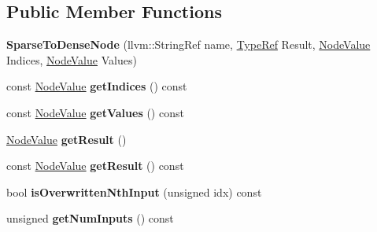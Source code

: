 \subsection*{Public Member Functions}
\begin{DoxyCompactItemize}
\item 
\mbox{\label{classglow_1_1_sparse_to_dense_node_a163f44bee977c3b7066c01e13d07fe54}} 
{\bfseries Sparse\+To\+Dense\+Node} (llvm\+::\+String\+Ref name, \hyperlink{structglow_1_1_type}{Type\+Ref} Result, \hyperlink{structglow_1_1_node_value}{Node\+Value} Indices, \hyperlink{structglow_1_1_node_value}{Node\+Value} Values)
\item 
\mbox{\label{classglow_1_1_sparse_to_dense_node_a1ae3169aac5ba1321639c3113fb9944b}} 
const \hyperlink{structglow_1_1_node_value}{Node\+Value} {\bfseries get\+Indices} () const
\item 
\mbox{\label{classglow_1_1_sparse_to_dense_node_a22a90303e1df5a7caa4d2233deed0881}} 
const \hyperlink{structglow_1_1_node_value}{Node\+Value} {\bfseries get\+Values} () const
\item 
\mbox{\label{classglow_1_1_sparse_to_dense_node_acbdf772e84548ecfb3ea69b4c42276f5}} 
\hyperlink{structglow_1_1_node_value}{Node\+Value} {\bfseries get\+Result} ()
\item 
\mbox{\label{classglow_1_1_sparse_to_dense_node_a46fbb8abafa831c68f174e3f4bb0df5b}} 
const \hyperlink{structglow_1_1_node_value}{Node\+Value} {\bfseries get\+Result} () const
\item 
\mbox{\label{classglow_1_1_sparse_to_dense_node_ab12d82ba06ecfc6e21e42933ce20b2c0}} 
bool {\bfseries is\+Overwritten\+Nth\+Input} (unsigned idx) const
\item 
\mbox{\label{classglow_1_1_sparse_to_dense_node_abdef5c7fb65b33ad1ad0f7be1ccc2d12}} 
unsigned {\bfseries get\+Num\+Inputs} () const
\item 
\mbox{\label{classglow_1_1_sparse_to_dense_node_a60733d49f311bdca07c0d657a1040bcf}} 

\end{DoxyCompactItemize}
